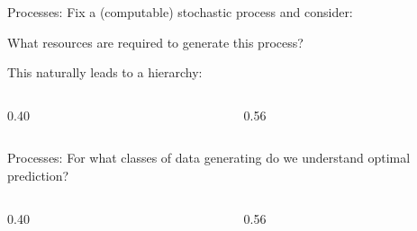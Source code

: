 \documentclass[aspectratio=169,11pt]{beamer}
\newcommand{\uw}[1]{\underline{\smash{#1}}}
\begin{document}
\begin{frame}{Processes:}
  \vspace{0.3em}
  Fix a (computable) stochastic process and consider:
  \vspace{0.4em}

  What resources are required to generate this process?
  \vspace{0.4em}

  This naturally leads to a hierarchy:
  \vspace{0.2em}
  \begin{columns}[c]
    \begin{column}{0.40\textwidth}
      \begin{center}\resizebox{!}{0.50\textheight}{\figHierarchy}\end{center}
    \end{column}
    \begin{column}{0.56\textwidth}
      {\small\hierarchykey}
    \end{column}
  \end{columns}
\end{frame}

\begin{frame}{Processes:}
  \vspace{0.3em}
  For what classes of data generating \uw{processes} do we understand
  optimal prediction?
  \vspace{0.2em}
  \begin{columns}[c]
    \begin{column}{0.40\textwidth}
      \begin{center}\resizebox{!}{0.52\textheight}{\figHierarchyGreen}\end{center}
    \end{column}
    \begin{column}{0.56\textwidth}
      {\small\hierarchykey}
    \end{column}
  \end{columns}
\end{frame}
\end{document}
